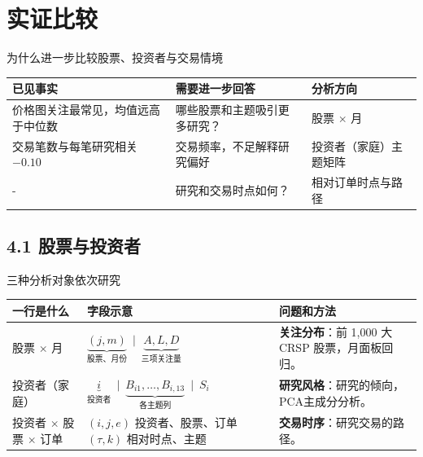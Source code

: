 \section{实证比较}

\begin{frame}[label=empirical-why]{为什么进一步比较股票、投资者与交易情境}
  \small
  \begin{tabularx}{\linewidth}{@{}L{.29\linewidth}YL{.24\linewidth}@{}}
    \toprule 已见事实 & 需要进一步回答 & 分析方向\\\midrule
    价格图关注最常见，均值远高于中位数 & 哪些股票和主题吸引更多研究？ & 股票 \(\times\) 月\\\midrule
    交易笔数与每笔研究相关 \(-0.10\) & 交易频率，不足解释研究偏好 & 投资者（家庭）主题矩阵\\\midrule
    - & 研究和交易时点如何？ & 相对订单时点与路径\\\bottomrule
  \end{tabularx}\par\medskip
\end{frame}

\subsection{4.1 股票与投资者}
\begin{frame}[label=slices]{三种分析对象依次研究}
  \small
  \begin{tabularx}{\linewidth}{@{}L{.24\linewidth}YY@{}}
    \toprule 一行是什么 & 字段示意 & 问题和方法\\\midrule
    股票 \(\times\) 月 & \(\underbrace{(j,m)}_{\text{股票、月份}}\ \mid\ \underbrace{A,L,D}_{\text{三项关注量}}\) &
      \textbf{关注分布}：前 1,000 大 CRSP 股票，月面板回归。\\\midrule
    投资者（家庭） & \(\underbrace{i}_{\text{投资者}}\ \mid\ \underbrace{B_{i1},\ldots,B_{i,13}}_{\text{各主题列}}\ \mid\ S_i\) &
      \textbf{研究风格}：研究的倾向，PCA主成分分析。\\\midrule
    投资者 \(\times\) 股票 \(\times\) 订单 &
      \((i,j,e)\) 投资者、股票、订单\newline \((\tau,k)\) 相对时点、主题 &
      \textbf{交易时序}：研究交易的路径。\\
    \bottomrule
  \end{tabularx}
\end{frame}

